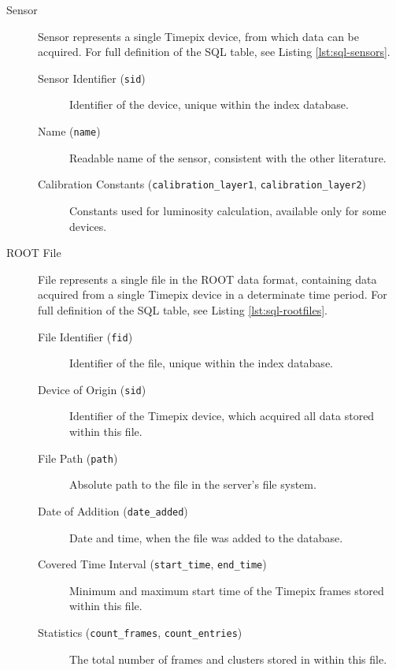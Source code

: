 
\label{db:definition}
\begin{description}
	\item[Sensor]
	Sensor represents a single Timepix device, from which data can be acquired. For full definition of the SQL table, see Listing \ref{lst:sql-sensors}.

	\begin{description}
		\item[Sensor Identifier (\texttt{sid})]
		Identifier of the device, unique within the index database.

		\item[Name (\texttt{name})]
		Readable name of the sensor, consistent with the other literature.

		\item[Calibration Constants (\texttt{calibration\_layer1}, \texttt{calibration\_layer2})]
		Constants used for luminosity calculation, available only for some devices.
	\end{description}

	\item[ROOT File]
	File represents a single file in the ROOT data format, containing data acquired from a single Timepix device in a determinate time period. For full definition of the SQL table, see Listing \ref{lst:sql-rootfiles}.

	\begin{description}
		\item[File Identifier (\texttt{fid})] 
		Identifier of the file, unique within the index database.

		\item[Device of Origin (\texttt{sid})]
		Identifier of the Timepix device, which acquired all data stored within this file.

		\item[File Path (\texttt{path})] 
		Absolute path to the file in the server's file system.

		\item[Date of Addition (\texttt{date\_added})]
		Date and time, when the file was added to the database.

		\item[Covered Time Interval (\texttt{start\_time}, \texttt{end\_time})]
		Minimum and maximum start time of the Timepix frames stored within this file.

		\item[Statistics (\texttt{count\_frames}, \texttt{count\_entries})]
		The total number of frames and clusters stored in within this file.


\end{description}
\end{description}

